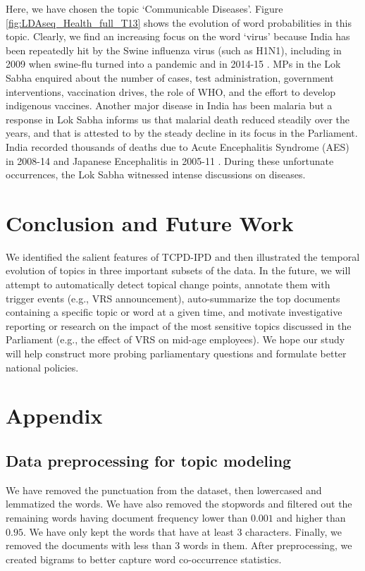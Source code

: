 \documentclass[10pt, a4paper]{article}
\begin{document}
Here, we have chosen the topic `Communicable Diseases'. Figure \ref{fig:LDAseq_Health_full_T13} shows the evolution of word probabilities in this topic. Clearly, we find an increasing focus on the word `virus' because India has been repeatedly hit by the Swine influenza virus (such as H1N1), including in 2009 when swine-flu turned into a pandemic and in 2014-15 \cite{kshatriya2018lessons}. MPs in the Lok Sabha enquired about the number of cases, test administration, government interventions, vaccination drives, the role of WHO, and the effort to develop indigenous vaccines. 
Another major disease in India has been malaria but a response in Lok Sabha informs us that malarial death reduced steadily over the years, and that is attested to by the steady decline in its focus in the Parliament. India recorded thousands of deaths due to Acute Encephalitis Syndrome (AES) in 2008-14 \cite{ghosh2016acute} and Japanese Encephalitis in 2005-11 \cite{adhya2013japanese}. During these unfortunate occurrences,  the Lok Sabha witnessed intense discussions on diseases. 




\section{Conclusion and Future Work}
We identified the salient features of TCPD-IPD and then illustrated the temporal evolution of topics in three important subsets of the data. 
In the future, we will attempt to automatically detect topical change points, annotate them with trigger events (e.g., VRS announcement), auto-summarize the top documents containing a specific topic or word at a given time,  and motivate investigative reporting or research on the impact of the most sensitive topics discussed in the Parliament (e.g., the effect of VRS on mid-age employees). We hope our study will help  construct more probing parliamentary questions and formulate better national policies.

\section{Appendix}
\label{sec:appendix}
 \subsection{Data preprocessing for topic modeling}
 \label{ap:preprocess}
 We have removed the punctuation from the dataset, then lowercased and lemmatized the words. We have also removed the stopwords and filtered out the remaining words having document frequency lower than $0.001$ and higher than $0.95$. We have only kept the words that have at least 3 characters. Finally, we removed the documents with less than 3 words in them. After preprocessing, we created bigrams to better capture word co-occurrence statistics.
 
\end{document}
